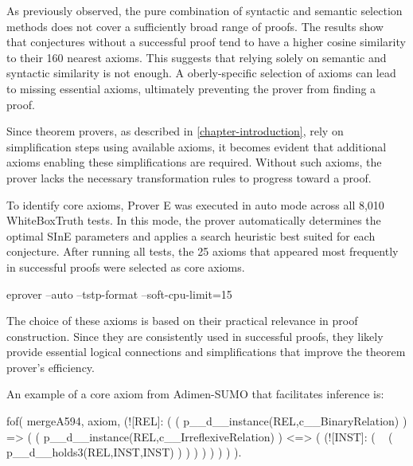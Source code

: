 \documentclass[english,version-2020-11]{uzl-thesis}
\begin{document}
As previously observed, the pure combination of syntactic and semantic selection methods does not cover a sufficiently broad range of proofs. The results show that conjectures without a successful proof tend to have a higher cosine similarity to their 160 nearest axioms. This suggests that relying solely on semantic and syntactic similarity is not enough. A oberly-specific selection of axioms can lead to missing essential axioms, ultimately preventing the prover from finding a proof.

Since theorem provers, as described in \ref{chapter-introduction}, rely on simplification steps using available axioms, it becomes evident that additional axioms enabling these simplifications are required. Without such axioms, the prover lacks the necessary transformation rules to progress toward a proof.

To identify core axioms, Prover E was executed in auto mode across all 8,010 WhiteBoxTruth tests. In this mode, the prover automatically determines the optimal SInE parameters and applies a search heuristic best suited for each conjecture. After running all tests, the 25 axioms that appeared most frequently in successful proofs were selected as core axioms.

\begin{Pseudocode}[morekeywords = {add, create}, deletekeywords={to}, numbers=left,
    caption = {Prover E configuration}]
    eprover --auto --tstp-format --soft-cpu-limit=15
\end{Pseudocode}


The choice of these axioms is based on their practical relevance in proof construction. Since they are consistently used in successful proofs, they likely provide essential logical connections and simplifications that improve the theorem prover's efficiency.

An example of a core axiom from Adimen-SUMO that facilitates inference is:


\begin{Pseudocode}[morekeywords = {add, create}, deletekeywords={to}, numbers=left, caption = {Example core axiom}]
    fof( mergeA594, axiom,
        (![REL]: 
            (
                (
                    p__d__instance(REL,c__BinaryRelation)
                )
                =>
                (
                    (
                        p__d__instance(REL,c__IrreflexiveRelation)
                    )
                    <=>
                    (
                        (![INST]: 
                            (
                                ~ (
                                    p__d__holds3(REL,INST,INST)
                                )
                            )
                        )
                    )
                )
            )
        )
    ).
\end{Pseudocode}
\end{document}
